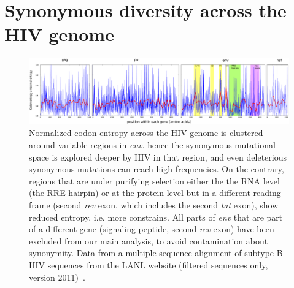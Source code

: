 \documentclass[rmp]{revtex4}
\begin{document}
\section{Synonymous diversity across the HIV genome}
\begin{figure}[h]
\begin{center}
\includegraphics[width=\linewidth]{conservation_codons_genome}
\caption{Normalized codon entropy across the HIV genome is clustered around
variable regions in {\it env}. hence the synonymous mutational space is explored
deeper by HIV in that region, and even deleterious synonymous mutations can
reach high frequencies.
On the contrary, regions that are under purifying selection either
the the RNA level (the RRE hairpin) or at the protein level but in a different
reading frame (second {\it rev} exon, which includes the second {\it tat} exon),
show reduced entropy, i.e. more constrains.
All parts of {\it env} that are part of a different gene (signaling peptide,
second {\it rev} exon) have been excluded from our main analysis, to avoid
contamination about synonymity.
Data from a multiple sequence alignment of subtype-B HIV sequences from the LANL
website (filtered sequences only, version 2011)~\cite{LANL2012}.}
\label{fig:syndiv_genome}
\end{center}
\end{figure}

\clearpage

\end{document}
